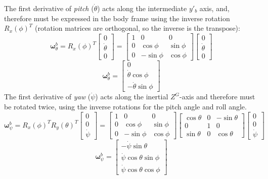 \documentclass[conf]{new-aiaa}
\begin{document}
\noindent The first derivative of \textit{pitch} ($\dot{\theta}$) acts along the intermediate $y'_b$ axis, and, therefore must be expressed in the body frame using the inverse rotation $R_x(\phi)^{T}$ (rotation matrices are orthogonal, so the inverse is the transpose): 
$$\boldsymbol{\omega}_{\theta}^b = R_x(\phi)^{T} \begin{bmatrix} 0 \\ \dot{\theta} \\ 0 \end{bmatrix} = \begin{bmatrix} 1 & 0 & 0 \\ 0 & \cos\phi & \sin\phi \\ 0 & -\sin\phi & \cos\phi \end{bmatrix} \begin{bmatrix} 0 \\ \dot{\theta} \\ 0 \end{bmatrix}$$
 $$\boldsymbol{\omega}_{\theta}^b= \begin{bmatrix} 0 \\ \dot{\theta}\cos\phi \\ -\dot{\theta}\sin\phi \end{bmatrix}$$
\noindent The first derivative of \textit{yaw} ($\dot{\psi}$) acts along the inertial $Z^G$-axis and therefore must be rotated twice, using the inverse rotations for the pitch angle and roll angle. 
$$\boldsymbol{\omega}_{\psi}^b = R_x(\phi)^{T} R_y(\theta)^{T} \begin{bmatrix} 0 \\ 0 \\ \dot{\psi} \end{bmatrix} = \begin{bmatrix} 1 & 0 & 0 \\ 0 & \cos\phi & \sin\phi \\ 0 & -\sin\phi & \cos\phi \end{bmatrix} \begin{bmatrix} \cos\theta & 0 & -\sin\theta \\ 0 & 1 & 0 \\ \sin\theta & 0 & \cos\theta \end{bmatrix} \begin{bmatrix} 0 \\ 0 \\ \dot{\psi} \end{bmatrix}$$
$$\boldsymbol{\omega}_{\psi}^b = \begin{bmatrix} -\dot{\psi}\sin\theta \\ \dot{\psi}\cos\theta\sin\phi \\ \dot{\psi}\cos\theta\cos\phi \end{bmatrix}$$
\end{document}
